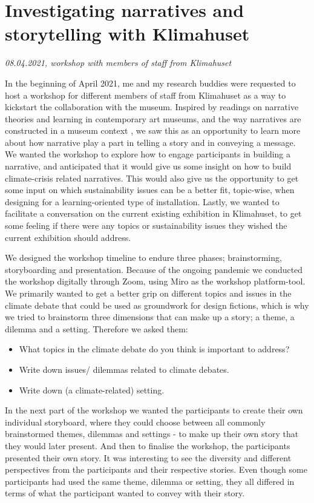 \section{Investigating narratives and storytelling with Klimahuset}
\par
\emph{08.04.2021, workshop with members of staff from Klimahuset}
\par

In the beginning of April 2021, me and my research buddies were requested to host a workshop for different members of staff from Klimahuset as a way to kickstart the collaboration with the museum. Inspired by readings on narrative theories and learning in contemporary art museums, and the way narratives are constructed in a museum context \autocite{narrative_sitzia}, we saw this as an opportunity to learn more about how narrative play a part in telling a story and in conveying a message. We wanted the workshop to explore how to engage participants in building a narrative, and anticipated that it would give us some insight on how to build climate-crisis related narratives. This would also give us the opportunity to get some input on which sustainability issues can be a better fit, topic-wise, when designing for a learning-oriented type of installation. Lastly, we wanted to facilitate a conversation on the current existing exhibition in Klimahuset, to get some feeling if there were any topics or sustainability issues they wished the current exhibition should address.

We designed the workshop timeline to endure three phases; brainstorming, storyboarding and presentation. Because of the ongoing pandemic we conducted the workshop digitally through Zoom, using Miro as the workshop platform-tool. We primarily wanted to get a better grip on different topics and issues in the climate debate that could be used as groundwork for design fictions, which is why we tried to brainstorm three dimensions that can make up a story; a theme, a dilemma and a setting. Therefore we asked them:

\begin{itemize}
    \item What topics in the climate debate do you think is important to address?
    \item Write down issues/ dilemmas related to climate debates.
    \item Write down (a climate-related) setting.
\end{itemize}

In the next part of the workshop we wanted the participants to create their own individual storyboard, where they could choose between all commonly brainstormed themes, dilemmas and settings - to make up their own story that they would later present. And then to finalise the workshop, the participants presented their own story. It was interesting to see the diversity and different perspectives from the participants and their respective stories. Even though some participants had used the same theme, dilemma or setting, they all differed in terms of what the participant wanted to convey with their story. 

